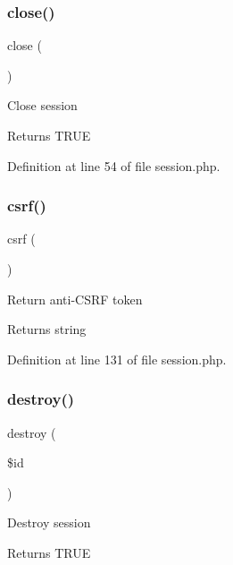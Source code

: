\subsubsection{\texorpdfstring{close()}{close()}}
{\footnotesize\ttfamily close (\begin{DoxyParamCaption}{ }\end{DoxyParamCaption})}

Close session \begin{DoxyReturn}{Returns}
T\+R\+UE 
\end{DoxyReturn}


Definition at line 54 of file session.\+php.

\hypertarget{class_d_b_1_1_mongo_1_1_session_a048d24aa22a28f92f1f3a7e3d323f45e}{}\label{class_d_b_1_1_mongo_1_1_session_a048d24aa22a28f92f1f3a7e3d323f45e} 
\subsubsection{\texorpdfstring{csrf()}{csrf()}}
{\footnotesize\ttfamily csrf (\begin{DoxyParamCaption}{ }\end{DoxyParamCaption})}

Return anti-\/\+C\+S\+RF token \begin{DoxyReturn}{Returns}
string 
\end{DoxyReturn}


Definition at line 131 of file session.\+php.

\hypertarget{class_d_b_1_1_mongo_1_1_session_a726fa8a4b4b187b9ca32ba427aac8137}{}\label{class_d_b_1_1_mongo_1_1_session_a726fa8a4b4b187b9ca32ba427aac8137} 
\subsubsection{\texorpdfstring{destroy()}{destroy()}}
{\footnotesize\ttfamily destroy (\begin{DoxyParamCaption}\item[{}]{\$id }\end{DoxyParamCaption})}

Destroy session \begin{DoxyReturn}{Returns}
T\+R\+UE 
\end{DoxyReturn}

